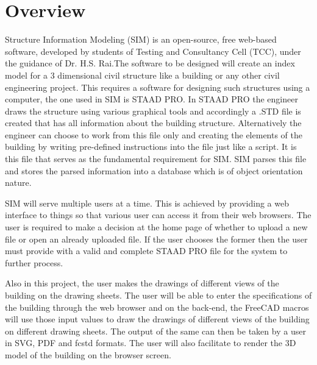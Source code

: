 \section{Overview}
Structure Information Modeling (SIM) is an open-source, free web-based software, developed by students
of Testing and Consultancy Cell (TCC), under the guidance of Dr. H.S. Rai.The software to be designed will create an index model for a 3 dimensional civil structure like a building or any other civil engineering project. This requires a software for designing such
structures using a computer, the one used in SIM is STAAD PRO. In STAAD PRO the engineer
draws the structure using various graphical tools and accordingly a .STD file is created that has
all information about the building structure. Alternatively the engineer can choose to work from
this file only and creating the elements of the building by writing pre-defined instructions into the
file just like a script. It is this file that serves as the fundamental requirement for SIM. SIM parses
this file and stores the parsed information into a database which is of object orientation nature.

SIM will serve multiple users at a time. This is achieved by providing a web interface to things
so that various user can access it from their web browsers. The user is required to make a decision
at the home page of whether to upload a new file or open an already uploaded file. If the user
chooses the former then the user must provide with a valid and complete STAAD PRO file for the
system to further process.

Also in this project, the user makes the drawings of different views of the building on the drawing sheets. The user
will be able to enter the specifications of the building through the web browser and on
the back-end, the FreeCAD macros will use those input values to draw the drawings of different
views of the building on different drawing sheets. The output of the same can then be taken by a
user in SVG, PDF and fcstd formats. The user will also facilitate to render the 3D model of the building on the browser screen.



